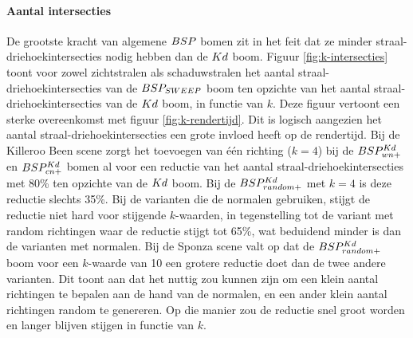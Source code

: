 \paragraph{Aantal intersecties}
De grootste kracht van algemene $BSP$ bomen zit in het feit dat ze minder straal-driehoekintersecties nodig hebben dan de $Kd$ boom.
Figuur \ref{fig:k-intersecties} toont voor zowel zichtstralen als schaduwstralen het aantal straal-driehoekintersecties van de $BSP_{SWEEP}$ boom ten opzichte van het aantal straal-driehoekintersecties van de $Kd$ boom, in functie van $k$.
Deze figuur vertoont een sterke overeenkomst met figuur \ref{fig:k-rendertijd}. 
Dit is logisch aangezien het aantal straal-driehoekintersecties een grote invloed heeft op de rendertijd.
Bij de Killeroo Been scene zorgt het toevoegen van één richting ($k = 4$) bij de $BSP^{Kd}_{wn+}$ en $BSP^{Kd}_{cn+}$ bomen al voor een reductie van het aantal straal-driehoekintersecties met 80\% ten opzichte van de $Kd$ boom. Bij de $BSP^{Kd}_{random+}$ met $k = 4$ is deze reductie slechts 35\%. Bij de varianten die de normalen gebruiken, stijgt de reductie niet hard voor stijgende $k$-waarden, in tegenstelling tot de variant met random richtingen waar de reductie stijgt tot 65\%, wat beduidend minder is dan de varianten met normalen.
Bij de Sponza scene valt op dat de $BSP^{Kd}_{random+}$ boom voor een $k$-waarde van 10 een grotere reductie doet dan de twee andere varianten.
Dit toont aan dat het nuttig zou kunnen zijn om een klein aantal richtingen te bepalen aan de hand van de normalen, en een ander klein aantal richtingen random te genereren. Op die manier zou de reductie snel groot worden en langer blijven stijgen in functie van $k$.

